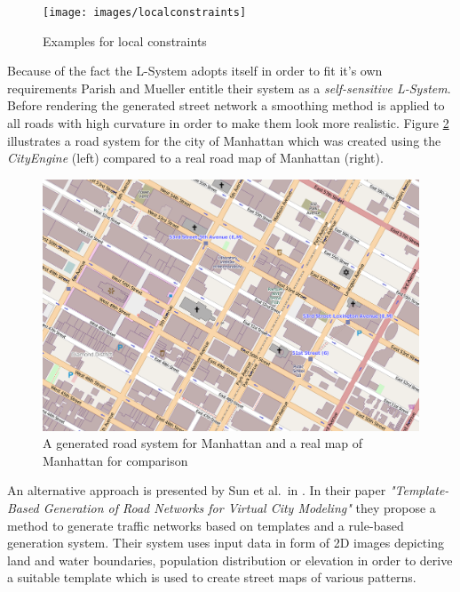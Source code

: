 \begin{figure}[H]
\begin{center}
\texttt{[image: images/localconstraints]}
\end{center}
\caption{Examples for local constraints \cite{parish01}}
\label{fig:localconstraints}
\end{figure}

\noindent
Because of the fact the L-System adopts itself in order to fit it's own requirements Parish and Mueller entitle their system as a \emph{self-sensitive L-System}. Before rendering the generated street network a smoothing method is applied to all roads with high curvature in order to make them look more realistic. Figure \ref{fig:manhattan} illustrates a road system for the city of Manhattan which was created using the \emph{CityEngine} (left) compared to a real road map of Manhattan (right).\\

\begin{figure}[H]
\begin{center}
\includegraphics[width=0.94\linewidth]{images/manhattan}
\end{center}
\caption{A generated road system for Manhattan and a real map of Manhattan for comparison \cite{parish01}}
\label{fig:manhattan}
\end{figure}

\newpage
\noindent
An alternative approach is presented by Sun et al.\ in \cite{sun02}. In their paper \emph{"Template-Based Generation of Road Networks
for Virtual City Modeling"} they propose a method to generate traffic networks based on templates and a rule-based generation system. Their system uses input data in form of 2D images depicting land and water boundaries, population distribution or elevation in order to derive a suitable template which is used to create street maps of various patterns.\\

